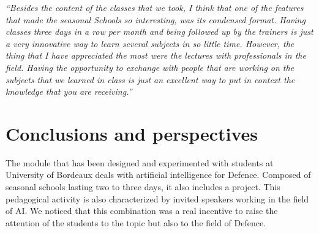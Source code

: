 \documentclass[conference]{IEEEtran}
\begin{document}
\noindent \textit{“Besides the content of the classes that we took, I think that one of the features that made the seasonal Schools so interesting, was its condensed format. Having classes three days in a row per month and being followed up by the trainers is just a very innovative way to learn several subjects in so little time. However, the thing that I have appreciated the most were the lectures with professionals in the field. Having the opportunity to exchange with people that are working on the subjects that we learned in class is just an excellent way to put in context the knowledge that you are receiving.”}

 \section{Conclusions and perspectives}
The module that has been designed and experimented with students at University of Bordeaux deals with artificial intelligence for Defence. Composed of seasonal schools lasting two to three days, it also includes a project. This pedagogical activity is also characterized by invited speakers working in the field of AI. We noticed that this combination was a real incentive to raise the attention of the students to the topic but also to the field of Defence.

\end{document}
